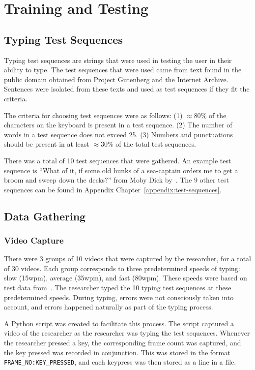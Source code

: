 \documentclass{report}
\begin{document}
\section{Training and Testing}

\subsection{Typing Test Sequences}
Typing test sequences are strings that were used in testing the user in their
ability to type. The test sequences that were used came from text found in the
public domain obtained from Project Gutenberg and the Internet Archive.
Sentences were isolated from these texts and used as test sequences if they fit
the criteria.

The criteria for choosing test sequences were as follows: (1) $\approx80\%$ of
the characters on the keyboard is present in a test sequence. (2) The number of
words in a test sequence does not exceed 25. (3) Numbers and punctuations should
be present in at least $\approx30\%$ of the total test sequences.

There was a total of 10 test sequences that were gathered. An example test
sequence is ``What of it, if some old hunks of a sea-captain orders me to get a
broom and sweep down the decks?'' from Moby Dick by~\cite{moby-dick}. The 9
other test sequences can be found in Appendix
Chapter~\ref{appendix:test-sequences}.

\subsection{Data Gathering}
\subsubsection{Video Capture}
There were 3 groups of 10 videos that were captured by the researcher, for a
total of 30 videos. Each group corresponds to three predetermined speeds of
typing: slow (15wpm), average (35wpm), and fast (80wpm). These speeds were based
on test data from~\cite{keybr}. The researcher typed the 10 typing test
sequences at these predetermined speeds. During typing, errors were not
consciously taken into account, and errors happened naturally as part of the
typing process.

A Python script was created to facilitate this process. The script captured a
video of the researcher as the researcher was typing the test sequences.
Whenever the researcher pressed a key, the corresponding frame count was
captured, and the key pressed was recorded in conjunction. This was stored in
the format \texttt{FRAME\_NO:KEY\_PRESSED}, and each keypress was then stored as
a line in a file.
\end{document}
